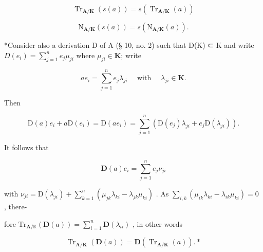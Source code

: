 \[
\operatorname{Tr} _ {\mathbf {A} / \mathbf {K}} (s (a)) = s (\operatorname{Tr} _ {\mathbf {A} / \mathbf {K}} (a))\tag{28}
\]

\[
\mathrm{N} _ {\mathbf {A} / \mathbf {K}} (s (a)) = s (\mathrm{N} _ {\mathbf {A} / \mathbf {K}} (a)).
\]

*Consider also a derivation D of A (§ 10, no. 2) such that D(K) ⊂ K and write \(D (e _ {i}) = \sum_ {j = 1} ^ {n} e _ {j} \mu_ {j i}\) where \(\mu_ {j i} \in \mathbf {K}\); write

\[
a e _ {i} = \sum_ {j = 1} ^ {n} e _ {j} \lambda_ {j i} \quad \text { with } \quad \lambda_ {j i} \in \mathbf {K}.
\]

Then

\[
\mathrm{D} (a) e _ {i} + a \mathrm{D} (e _ {i}) = \mathrm{D} (a e _ {i}) = \sum_ {j = 1} ^ {n} (\mathrm{D} (e _ {j}) \lambda_ {j i} + e _ {j} \mathrm{D} (\lambda_ {j i})).
\]

It follows that

\[
\mathbf {D} (a) e _ {i} = \sum_ {j = 1} ^ {n} e _ {j} \nu_ {j i}
\]

with \(\nu_{ji} = \mathrm{D}(\lambda_{ji}) + \sum_{k=1}^{n} (\mu_{jk}\lambda_{ki} - \lambda_{jk}\mu_{ki})\) . As \(\sum_{i,k} (\mu_{ik}\lambda_{ki} - \lambda_{ik}\mu_{ki}) = 0\) , there-

fore \(\mathrm{Tr}_{\mathbf{A} / \mathbb{K}}(\mathbf{D}(a)) = \sum_{i = 1}^{n}\mathbf{D}(\lambda_{ii})\) , in other words

\[
\operatorname{Tr} _ {\mathbf {A} / \mathbf {K}} (\mathbf {D} (a)) = \mathbf {D} (\operatorname{Tr} _ {\mathbf {A} / \mathbf {K}} (a)). *\tag{29}
\]

